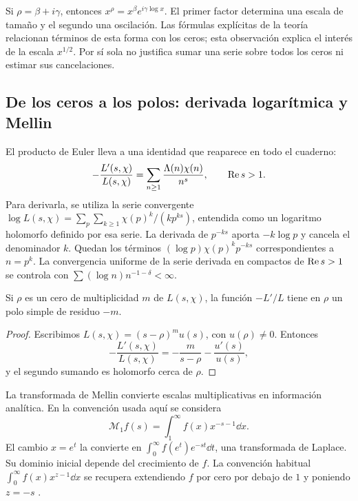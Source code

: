 Si $\rho=\beta+i\gamma$, entonces
$x^\rho=x^\beta e^{i\gamma\log x}$. El primer factor determina una
escala de tamaño y el segundo una oscilación. Las fórmulas explícitas de
la teoría relacionan términos de esta forma con los ceros; esta observación
explica el interés de la escala $x^{1/2}$. Por sí sola no justifica sumar
una serie sobre todos los ceros ni estimar sus cancelaciones.

\subsection{De los ceros a los polos: derivada logarítmica y Mellin}

El producto de Euler lleva a una identidad que reaparece en todo el
cuaderno:
\begin{equation}
 -\frac{L'(s,\chi)}{L(s,\chi)}
   =\sum_{n\ge1}\frac{\Lambda(n)\chi(n)}{n^s},
 \qquad \operatorname{Re} s>1.
 \label{eq:intro-logderivada}
\end{equation}
Para derivarla, se utiliza la serie convergente
$\log L(s,\chi)=\sum_p\sum_{k\ge1}\chi(p)^k/(k p^{ks})$,
entendida como un logaritmo holomorfo definido por esa serie.
La derivada de $p^{-ks}$ aporta $-k\log p$ y cancela el denominador $k$.
Quedan los términos $(\log p)\chi(p)^k p^{-ks}$ correspondientes a
$n=p^k$. La convergencia uniforme de la serie derivada en compactos de
$\operatorname{Re} s>1$ se controla con $\sum (\log n)n^{-1-\delta}<\infty$.

\begin{proposicion}
Si $\rho$ es un cero de multiplicidad $m$ de $L(s,\chi)$, la función
$-L'/L$ tiene en $\rho$ un polo simple de residuo $-m$.
\end{proposicion}
\begin{proof}
Escribimos $L(s,\chi)=(s-\rho)^m u(s)$, con $u(\rho)\ne0$.
Entonces
\[
 -\frac{L'(s,\chi)}{L(s,\chi)}
 =-\frac{m}{s-\rho}-\frac{u'(s)}{u(s)},
\]
y el segundo sumando es holomorfo cerca de $\rho$.
\end{proof}

La transformada de Mellin convierte escalas multiplicativas en información
analítica. En la convención usada aquí se considera
\[
 \mathcal M_1 f(s)=\int_1^\infty f(x)x^{-s-1}\dd x.
\]
El cambio $x=e^t$ la convierte en
$\int_0^\infty f(e^t)e^{-st}\dd t$, una transformada de Laplace.
Su dominio inicial depende del crecimiento de $f$.
La convención habitual $\int_0^\infty f(x)x^{z-1}\dd x$ se recupera
extendiendo $f$ por cero por debajo de $1$ y poniendo $z=-s$
\cite[ecuación 2.5.1]{dlmf-analisis}.

